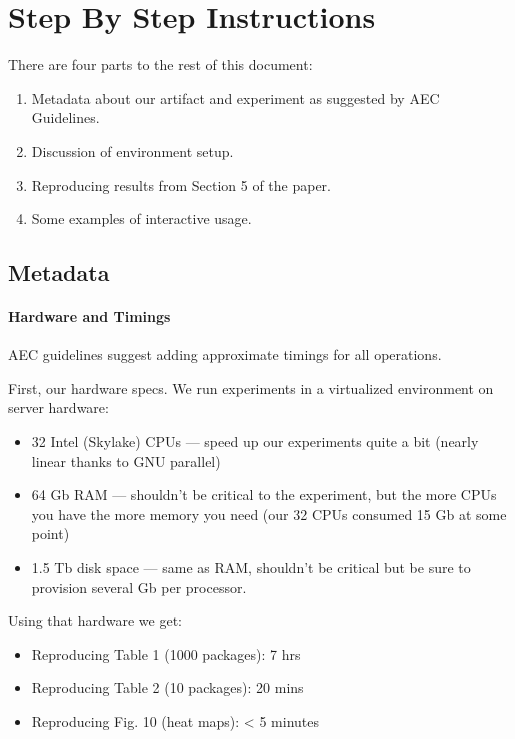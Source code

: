 \documentclass[
]{article}
\providecommand{\tightlist}{%
  \setlength{\itemsep}{0pt}\setlength{\parskip}{0pt}}
\begin{document}
\hypertarget{step-by-step-instructions}{%
\section{Step By Step Instructions}\label{step-by-step-instructions}}

There are four parts to the rest of this document:

\begin{enumerate}
\def\labelenumi{\arabic{enumi}.}
\item
  Metadata about our artifact and experiment as suggested by AEC
  Guidelines.
\item
  Discussion of environment setup.
\item
  Reproducing results from Section 5 of the paper.
\item
  Some examples of interactive usage.
\end{enumerate}

\hypertarget{metadata}{%
\subsection{Metadata}\label{metadata}}

\hypertarget{hardware-and-timings}{%
\paragraph{Hardware and Timings}\label{hardware-and-timings}}

AEC guidelines suggest adding approximate timings for all operations.

First, our hardware specs. We run experiments in a virtualized
environment on server hardware:

\begin{itemize}
\item
  32 Intel (Skylake) CPUs --- speed up our experiments quite a bit
  (nearly linear thanks to GNU parallel)
\item
  64 Gb RAM --- shouldn't be critical to the experiment, but the more
  CPUs you have the more memory you need (our 32 CPUs consumed 15 Gb at
  some point)
\item
  1.5 Tb disk space --- same as RAM, shouldn't be critical but be sure to
  provision several Gb per processor.
\end{itemize}

Using that hardware we get:

\begin{itemize}
\tightlist
\item
  Reproducing Table 1 (1000 packages): 7 hrs
\item
  Reproducing Table 2 (10 packages): 20 mins
\item
  Reproducing Fig. 10 (heat maps): \textless{} 5 minutes
\end{itemize}
\end{document}
